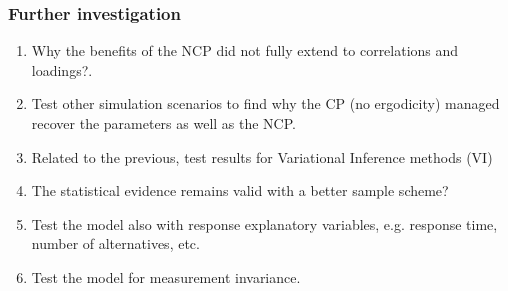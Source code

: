 \documentclass[arial,12pt,xcolor=dvipsnames]{beamer}
\begin{document}
\begin{frame}
	\frametitle{Further investigation}
	\begin{enumerate}
		\item Why the benefits of the NCP did not fully extend to correlations and loadings?.
		\item Test other simulation scenarios to find why the CP (no ergodicity) managed recover the parameters as well as the NCP.
		\item Related to the previous, test results for Variational Inference methods (VI)
		\item The statistical evidence remains valid with a better sample scheme?
		\item Test the model also with response explanatory variables, e.g. response time, number of alternatives, etc.
		\item Test the model for measurement invariance.
	\end{enumerate}
\end{frame}
%
%
\end{document}
